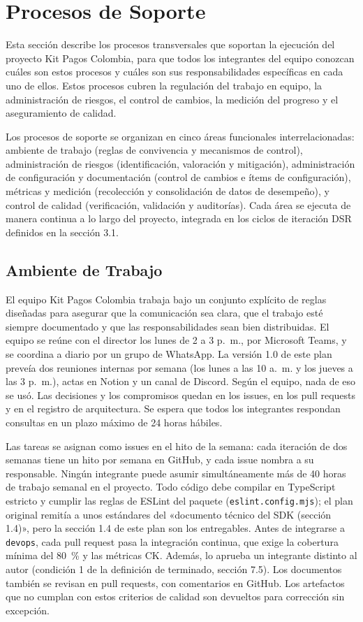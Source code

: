 \section{Procesos de Soporte}

Esta sección describe los procesos transversales que soportan la ejecución del proyecto Kit Pagos Colombia, para que todos los integrantes del equipo conozcan cuáles son estos procesos y cuáles son sus responsabilidades específicas en cada uno de ellos. Estos procesos cubren la regulación del trabajo en equipo, la administración de riesgos, el control de cambios, la medición del progreso y el aseguramiento de calidad.

Los procesos de soporte se organizan en cinco áreas funcionales interrelacionadas: ambiente de trabajo (reglas de convivencia y mecanismos de control), administración de riesgos (identificación, valoración y mitigación), administración de configuración y documentación (control de cambios e ítems de configuración), métricas y medición (recolección y consolidación de datos de desempeño), y control de calidad (verificación, validación y auditorías). Cada área se ejecuta de manera continua a lo largo del proyecto, integrada en los ciclos de iteración DSR definidos en la sección 3.1.

\subsection{Ambiente de Trabajo}

El equipo Kit Pagos Colombia trabaja bajo un conjunto explícito de reglas diseñadas para asegurar que la comunicación sea clara, que el trabajo esté siempre documentado y que las responsabilidades sean bien distribuidas. El equipo se reúne con el director los lunes de 2 a 3 p.~m., por Microsoft Teams, y se coordina a diario por un grupo de WhatsApp. La versión 1.0 de este plan preveía dos reuniones internas por semana (los lunes a las 10 a.~m. y los jueves a las 3 p.~m.), actas en Notion y un canal de Discord. Según el equipo, nada de eso se usó. Las decisiones y los compromisos quedan en los issues, en los pull requests y en el registro de arquitectura. Se espera que todos los integrantes respondan consultas en un plazo máximo de 24 horas hábiles.

Las tareas se asignan como issues en el hito de la semana: cada iteración de dos semanas tiene un hito por semana en GitHub, y cada issue nombra a su responsable. Ningún integrante puede asumir simultáneamente más de 40 horas de trabajo semanal en el proyecto. Todo código debe compilar en TypeScript estricto y cumplir las reglas de ESLint del paquete (\texttt{eslint.config.mjs}); el plan original remitía a unos estándares del «documento técnico del SDK (sección 1.4)», pero la sección 1.4 de este plan son los entregables. Antes de integrarse a \texttt{devops}, cada pull request pasa la integración continua, que exige la cobertura mínima del 80~\% y las métricas CK. Además, lo aprueba un integrante distinto al autor (condición 1 de la definición de terminado, sección 7.5). Los documentos también se revisan en pull requests, con comentarios en GitHub. Los artefactos que no cumplan con estos criterios de calidad son devueltos para corrección sin excepción.

